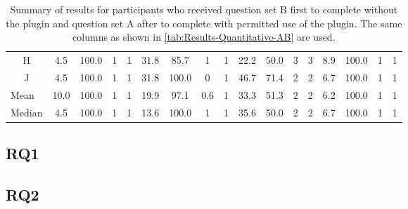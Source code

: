 \begin{landscape}
\begin{table}[p]
\begin{tabular}{@{}ccccccccccccccccc@{}}
      \multicolumn{1}{c|}{H}              & 4.5  & 100.0 & 1    & \multicolumn{1}{c|}{1}    & 31.8                     & 85.7                     & 1                        & \multicolumn{1}{c|}{1}    & 22.2 & 50.0                     & 3                        & \multicolumn{1}{c|}{3}    & 8.9                      & 100.0                    & 1                        & 1                        \\
      \multicolumn{1}{c|}{J}              & 4.5  & 100.0 & 1    & \multicolumn{1}{c|}{1}    & 31.8                     & 100.0                    & 0                        & \multicolumn{1}{c|}{1}    & 46.7 & 71.4                     & 2                        & \multicolumn{1}{c|}{2}    & 6.7                      & 100.0                    & 1                        & 1                        \\ \midrule
      \multicolumn{1}{l|}{Mean}           & 10.0 & 100.0 & 1    & \multicolumn{1}{c|}{1}    & 19.9                     & 97.1                     & 0.6                      & \multicolumn{1}{c|}{1}    & 33.3 & 51.3                     & 2                        & \multicolumn{1}{c|}{2}    & 6.2                      & 100.0                    & 1                        & 1                        \\
      \multicolumn{1}{l|}{Median}         & 4.5  & 100.0 & 1    & \multicolumn{1}{c|}{1}    & 13.6                     & 100.0                    & 1                        & \multicolumn{1}{c|}{1}    & 35.6 & 50.0                     & 2                        & \multicolumn{1}{c|}{2}    & 6.7                      & 100.0                    & 1                        & 1                        \\ \bottomrule
    \end{tabular}
    \caption{
      Summary of results for participants who received question set B first to complete without the plugin and question set A after to complete with permitted use of the plugin.
      The same columns as shown in \autoref{tab:Results-Quantitative-AB} are used.
    }
    \label{tab:Results-Quantitative-BA}
  \end{table}
  \end{landscape}

\subsection{RQ1}

\subsection{RQ2}

